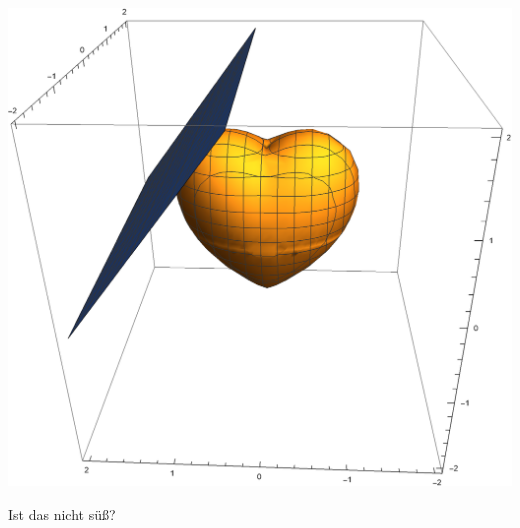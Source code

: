 \documentclass[main.tex]{subfiles}
\begin{document}
\begin{Beispiel}
  \begin{center}
  \includegraphics[scale = 0.5]{./img/tangentialraum_beispiel}
  \end{center}
  Ist das nicht süß?
\end{Beispiel}
\end{document}
